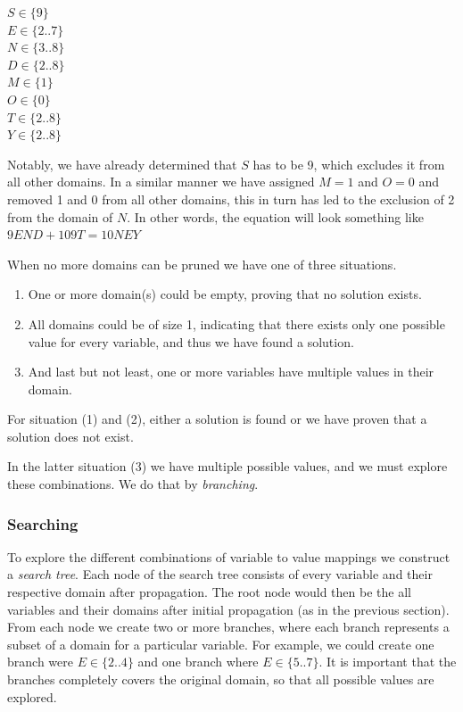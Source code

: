 \vspace{0.5cm}
\noindent
$S \in \{9\}$ \\
$E \in \{2..7\}$ \\
$N \in \{3..8\}$ \\
$D \in \{2..8\}$ \\
$M \in \{1\}$ \\
$O \in \{0\}$ \\
$T \in \{2..8\}$ \\
$Y \in \{2..8\}$

Notably, we have already determined that $S$ has to be 9, which excludes it from all other
domains. In a similar manner we have assigned $M=1$ and $O=0$ and removed 1 and 0 from all
other domains, this in turn has led to the exclusion of 2 from the domain of $N$. In other
words, the equation will look something like $9END + 109T = 10NEY$

When no more domains can be pruned we have one of three situations.

\begin{enumerate}
	\item One or more domain(s) could be empty, proving that no solution exists.
	\item	All domains could be of size 1, indicating that there exists only one possible
		value for every variable, and thus we have found a solution.
	\item And last but not least, one or more variables have multiple values in their domain.
\end{enumerate}

For situation (1) and (2), either a solution is found or we have proven that a solution
does not exist.
		
In the latter situation (3) we have multiple possible values, and we must explore these
combinations. We do that by \textit{branching}.

\subsubsection{Searching}

To explore the different combinations of variable to value mappings we construct a \textit{
search tree}. Each node of the search tree consists of every variable and their respective
domain after propagation. The root node would then be the all variables and their domains
after initial propagation (as in the previous section). From each node we create two or
more branches, where each branch represents a subset of a domain for a particular variable.
For example, we could create one branch were $E \in \{2..4\}$ and one branch where $E \in 
\{5..7\}$. It is important that the branches completely covers the original
domain, so that all possible values are explored.


